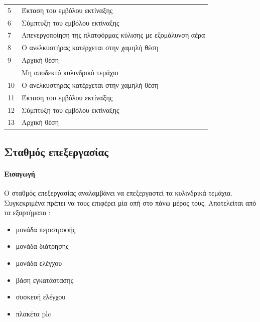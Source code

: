 \documentclass[a4paper,12pt,twoside]{report}
\begin{document}
\begin{longtable} { m{0.5cm} m{12cm} }
					 5 & Έκταση του εμβόλου εκτίναξης\\
					 6 & Σύμπτυξη του εμβόλου εκτίναξης\\
					 7 & Απενεργοποίηση της πλατφόρμας κύλισης με εξομάλυνση αέρα\\
					 8 & Ο ανελκυστήρας κατέρχεται στην χαμηλή θέση\\
					 9 & Αρχική θέση\\
					  & Μη αποδεκτό κυλινδρικό τεμάχιο\\
					 10 & Ο ανελκυστήρας κατέρχεται στην χαμηλή θέση\\
					 11 & Έκταση του εμβόλου εκτίναξης\\
					 12 & Σύμπτυξη του εμβόλου εκτίναξης\\
					 13 & Αρχική θέση\\
					\hline
				\end{longtable}
				
				
			\FloatBarrier
			\subsection{Σταθμός επεξεργασίας \cite{FestoMPSProcessingStationManual} \cite{ΤοΦυσικόΣύστημαFestoMPS} \cite{UMLΕνσωματωμέναΣυστήματα}}
			
			\label{ενότ:Σταθμός επεξεργασίας}
				\paragraph{Εισαγωγή} {Ο σταθμός επεξεργασίας αναλαμβάνει να επεξεργαστεί τα κυλινδρικά τεμάχια. Συγκεκριμένα πρέπει να τους επιφέρει μία οπή στο πάνω μέρος τους. Αποτελείται από τα εξαρτήματα :
				}
				\begin{itemize}
					\item μονάδα περιστροφής
					\item μονάδα διάτρησης
					\item μονάδα ελέγχου
					\item βάση εγκατάστασης
					\item συσκευή ελέγχου
					\item πλακέτα plc
				\end{itemize}
\end{document}

